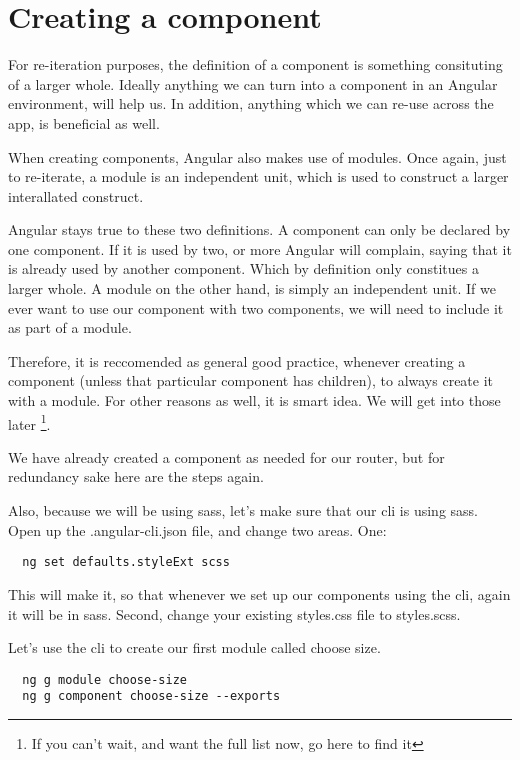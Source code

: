\maketitle{}
\section{ Creating a component }

For re-iteration purposes, the definition of a component is something consituting
of a larger whole. Ideally anything we can turn into a component in an Angular
environment, will help us. In addition, anything which we can re-use across the
app, is beneficial as well.

When creating components, Angular also makes use of modules. Once again, just to
re-iterate, a module is an independent unit, which is used to construct a larger
interallated construct.

Angular stays true to these two definitions. A component can only be declared by
one component. If it is used by two, or more Angular will complain, saying that it
is already used by another component. Which by definition only constitues a larger whole.
A module on the other hand, is simply an independent unit. If we ever want to use
our component with two components, we will need to include it as part of a module.

Therefore, it is reccomended as general good practice, whenever creating a
component (unless that particular component has children), to always create it
with a module. For other reasons as well, it is smart idea. We will get into
those later \footnote{If you can't wait, and want the full list now, go here to
find it}.

We have already created a component as needed for our router, but for redundancy
sake here are the steps again.

Also, because we will be using sass, let's make sure that our cli is using sass.
Open up the .angular-cli.json file, and change two areas. One:
\begin{verbatim}
  ng set defaults.styleExt scss
\end{verbatim}
This will make it, so that whenever we set up our components using the cli,
again it will be in sass. Second, change your existing styles.css file to
styles.scss.

Let's use the cli to create our first module called choose size.
\begin{verbatim}
  ng g module choose-size
  ng g component choose-size --exports
\end{verbatim}

